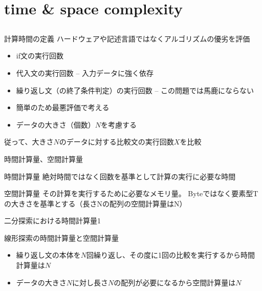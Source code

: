 \documentclass{beamer}
\subtitle{}
\begin{document}
\begin{frame}[fragile]{}
\titlepage
\end{frame}

\section{time \& space complexity}		%
\subsection{}

\begin{frame}[fragile]{計算時間の定義}{}
ハードウェアや記述言語ではなくアルゴリズムの優劣を評価
\begin{itemize}%
\item if文の実行回数
\item 代入文の実行回数 -- 入力データに強く依存
\item 繰り返し文（の終了条件判定）の実行回数 -- この問題では馬鹿にならない
\end{itemize}

\begin{itemize}\itemsep8pt
\item 簡単のため最悪評価で考える
\item データの大きさ（個数）$N$を考慮する
\end{itemize}

\vfill
従って、大きさ$N$のデータに対する比較文の実行回数$X$を比較
\end{frame}

\begin{frame}[fragile]{時間計算量、空間計算量}{}
\begin{block}{時間計算量}
絶対時間ではなく回数を基準として計算の実行に必要な時間
\end{block}
\begin{block}{空間計算量}
その計算を実行するために必要なメモリ量。
Byteではなく要素型Tの大きさを基準とする（長さNの配列の空間計算量はN）
\end{block}
\end{frame}

\begin{frame}[fragile]{二分探索における時間計算量1}{}

\begin{exampleblock}{線形探索の時間計算量と空間計算量}
\begin{itemize}%
\item 繰り返し文の本体を$N$回繰り返し、その度に1回の比較を実行するから時間計算量は$N$
\item データの大きさ$N$に対し長さ$N$の配列が必要になるから空間計算量は$N$
\end{itemize}
\end{exampleblock}
\end{frame}
\end{document}
